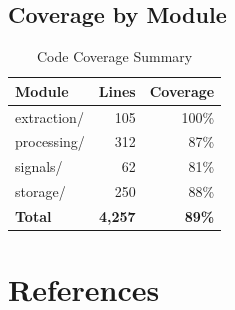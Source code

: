 \documentclass[11pt, a4paper, twoside]{article}
\begin{document}
\subsection{Coverage by Module}

\begin{table}[H]
    \centering
    \caption{Code Coverage Summary}
    \label{tab:coverage-summary}
    \begin{tabular}{|l|r|r|}
        \hline
        \textbf{Module} & \textbf{Lines} & \textbf{Coverage} \\
        \hline
        extraction/ & 105 & 100\% \\
        processing/ & 312 & 87\% \\
        signals/ & 62 & 81\% \\
        storage/ & 250 & 88\% \\
        \hline
        \textbf{Total} & \textbf{4,257} & \textbf{89\%} \\
        \hline
    \end{tabular}
\end{table}


\newpage
\section*{References}

\printbibliography[heading=none]

\end{document}
